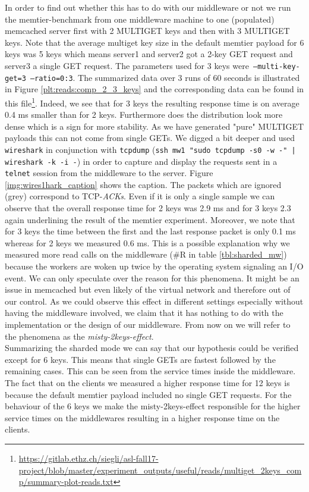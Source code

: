 \documentclass[11pt,a4paper]{article}
\let\ti\textit
\let\tt\texttt
\begin{document}
In order to find out whether this has to do with our middleware or not we run the memtier-benchmark from one middleware machine to one (populated) memcached server first with 2 MULTIGET keys and then with 3 MULTIGET keys. Note that the average multiget key size in the default memtier payload for 6 keys was 5 keys which means server1 and server2 got a 2-key GET request and server3 a single GET request. The parameters used for 3 keys were\tt{ --multi-key-get=3 --ratio=0:3}. The summarized data over 3 runs of 60 seconds is illustrated in Figure \ref{plt:reads:comp_2_3_keys} and the corresponding data can be found in this file\footnote{\url{https://gitlab.ethz.ch/siegli/asl-fall17-project/blob/master/experiment_outputs/useful/reads/multiget_2keys_comp/summary-plot-reads.txt}}. Indeed, we see that for 3 keys the resulting response time is on average 0.4 ms smaller than for 2 keys. Furthermore does the distribution look more dense which is a sign for more stability. As we have generated "pure" MULTIGET payloads this can not come from single GETs. We digged a bit deeper and used \tt{wireshark}\cite{wireshark} in conjunction with \tt{tcpdump} (\tt{ssh mw1 "sudo tcpdump -s0 -w -" | wireshark -k -i -}) in order to capture and display the requests sent in a \tt{telnet} session from the middleware to the server. Figure \ref{img:wires1hark_caption} shows the caption. The packets which are ignored (grey) correspond to TCP-\ti{ACKs}. Even if it is only a single sample we can observe that the overall response time for 2 keys was 2.9 ms and for 3 keys 2.3 again underlining the result of the memtier experiment. Moreover, we note that for 3 keys the time between the first and the last response packet is only 0.1 ms whereas for 2 keys we measured 0.6 ms. This is a possible explanation why we measured more read calls on the middleware (\#R in table \ref{tbl:sharded_mw}) because the workers are woken up twice by the operating system signaling an I/O event. We can only speculate over the reason for this phenomena. It might be an issue in memcached but even likely of the virtual network and therefore out of our control. As we could observe this effect in different settings especially without having the middleware involved, we claim that it has nothing to do with the implementation or the design of our middleware. From now on we will refer to the phenomena as the \ti{misty-2keys-effect}.\\


Summarizing the sharded mode we can say that our hypothesis could be verified except for 6 keys. This means that single GETs are fastest followed by the remaining cases. This can be seen from the service times inside the middleware. The fact that on the clients we measured a higher response time for 12 keys is because the default memtier payload included no single GET requests. For the behaviour of the 6 keys we make the misty-2keys-effect responsible for the higher service times on the middlewares resulting in a higher response time on the clients.
\end{document}
